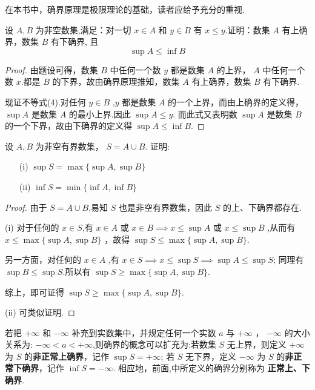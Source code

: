 在本书中，确界原理是极限理论的基础，读者应给予充分的重视.

\begin{example}
    设 $A,B$ 为非空数集,满足：对一切 $x\in A$ 和 $y\in B$ 有 $x\le y$.证明：数集 $A$ 有上确界，数集 $B$ 有下确界, 且 \begin{equation}
        \sup A\le \inf B 
    \end{equation} 
\end{example}

\begin{proof}
    由题设可得，数集 $B$ 中任何一个数 $y$ 都是数集 $A$ 的上界， $A$ 中任何一个数 $x$.都是 $B$ 的下界，故由确界原理推知，数集 $A$ 有上确界，数集 $B$ 有下确界.

    现证不等式(4).对任何 $y\in B$ ,$y$ 都是数集 $A$ 的一个上界，而由上确界的定义得，$\sup A$ 是数集 $A$ 的最小上界.因此 $\sup A\le y$. 而此式又表明数 $\sup A$ 是数集 $B$ 的一个下界，故由下确界的定义得 $\sup A\le \inf B$.
\end{proof}

\begin{example}
    设 $A,B$ 为非空有界数集， $S=A\cup B$. 证明:
    \begin{enumerate}
        \item[(i)] $\sup S=\max \{\sup A,\sup B\}$
        \item[(ii)] $\inf S=\min \{\inf A,\inf B\}$
    \end{enumerate}
\end{example}

\begin{proof}
    由于 $S=A\cup B$,易知 $S$ 也是非空有界数集，因此 $S$ 的上、下确界都存在.

    (i) 对于任何的 $x\in S$,有 $x\in A$ 或 $x\in B \implies x\le \sup A$ 或 $x \le \sup B$ ,从而有 $x\le \max \{\sup A,\sup B\}$ ，故得 $\sup S \le \max \{\sup A,\sup B\}$.

    另一方面，对任何的 $x\in A$ ,有 $x\in S \implies x \le \sup S \implies \sup A\le \sup S$; 同理有 $\sup B \le \sup S$.所以有 $\sup S\ge \max \{\sup A,\sup B\}$.

    综上，即可证得 $\sup S\ge \max \{\sup A,\sup B\}$.

    (ii) 可类似证明.
\end{proof}

若把 $+\infty$ 和 $-\infty$ 补充到实数集中，并规定任何一个实数 $a$ 与 $+\infty$ ， $-\infty$ 的大小关系为: $-\infty<a<+\infty$,则确界的概念可以扩充为:若数集 $S$ 无上界，则定义 $+\infty$ 为 $S$ 的\textbf{非正常上确界}，记作 $\sup S= +\infty$; 若 $S$ 无下界，定义 $-\infty$ 为 $S$ 的\textbf{非正常下确界}，记作 $\inf S = -\infty$. 相应地，前面,中所定义的确界分别称为 \textbf{正常上、下确界}.

